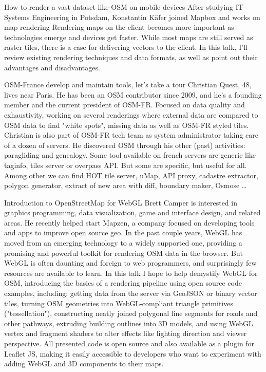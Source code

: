 %
{How to render a vast dataset like OSM on mobile devices}%
{After studying IT-Systems Engineering in Potsdam, Konstantin Käfer joined Mapbox and works on map rendering}%
{Rendering maps on the client becomes more important as technologies emerge and devices get faster. While most maps are still served as raster tiles, there is a case for delivering vectors to the client. In this talk, I'll review existing rendering techniques and data formats, as well as point out their advantages and disadvantages.}

%
{OSM-France develop and maintain tools, let's take a tour}%
{Christian Quest, 48, lives near Paris. He has been an OSM contributor
since 2009, and he's a founding member and the current president of
OSM-FR. Focused on data quality and exhaustivity, working on several
renderings where external data are compared to OSM data to find "white
spots", missing data as well as OSM-FR styled tiles. Christian is also
part of OSM-FR tech team as system administrator taking care of a dozen
of servers. He discovered OSM through his other (past) activities:
paragliding and genealogy.}%
{Some tool available on french servers are generic like taginfo, tiles server or overpass API. But some are specific, but useful for all. Among other we can find HOT tile server, uMap, API proxy, cadastre extractor, polygon generator, extract of new area with diff, boundary maker, Osmose \dots}



%
{Introduction to OpenStreetMap for WebGL}%
{Brett Camper is interested in graphics programming, data visualization, game and interface design, and related areas. He recently helped start Mapzen, a company focused on developing tools and apps to improve open source geo.}%
{In the past couple years, WebGL has moved from an emerging technology to a widely supported one, providing a promising and powerful toolkit for rendering OSM data in the browser. But WebGL is often daunting and foreign to web programmers, and surprisingly few resources are available to learn. In this talk I hope to help demystify WebGL for OSM, introducing the basics of a rendering pipeline using open source code examples, including: getting data from the server via GeoJSON or binary vector tiles, turning OSM geometries into WebGL-compliant triangle primitives ("tessellation"), constructing neatly joined polygonal line segments for roads and other pathways, extruding building outlines into 3D models, and using WebGL vertex and fragment shaders to alter effects like lighting direction and viewer perspective. All presented code is open source and also available as a plugin for Leaflet JS, making it easily accessible to developers who want to experiment with adding WebGL and 3D components to their maps.}


